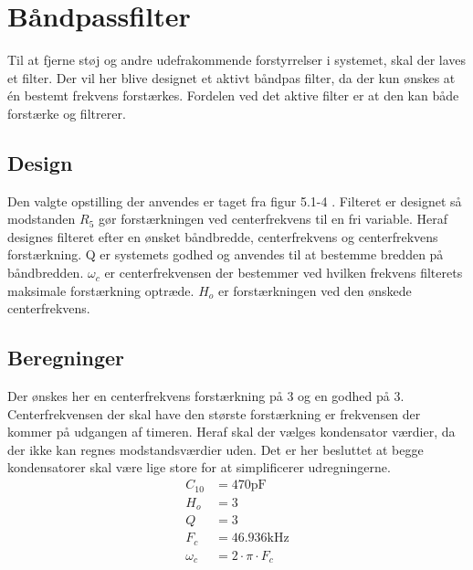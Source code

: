 \section{Båndpassfilter}\label{sec:filter}
Til at fjerne støj og andre udefrakommende forstyrrelser i systemet, skal der laves et filter.
Der vil her blive designet et aktivt båndpas filter, da der kun ønskes at én bestemt frekvens forstærkes.
Fordelen ved det aktive filter er at den kan både forstærke og filtrerer.

\subsection{Design}
Den valgte opstilling der anvendes er taget fra figur 5.1-4 \cite[side. 208]{Huelsman1993}.
Filteret er designet så modstanden $R_5$ gør forstærkningen ved centerfrekvens til en fri variable.
Heraf designes filteret efter en ønsket båndbredde, centerfrekvens og centerfrekvens forstærkning. Q er systemets godhed og anvendes til at bestemme bredden på båndbredden. 
$\omega_c$ er centerfrekvensen der bestemmer ved hvilken frekvens filterets maksimale forstærkning optræde.
$H_o$ er forstærkningen ved den ønskede centerfrekvens.

\subsection{Beregninger}
Der ønskes her en centerfrekvens forstærkning på 3 og en godhed på 3. 
Centerfrekvensen der skal have den største forstærkning er frekvensen der kommer på udgangen af timeren.
Heraf skal der vælges kondensator værdier, da der ikke kan regnes modstandsværdier uden. 
Det er her besluttet at begge kondensatorer skal være lige store for at simplificerer udregningerne.
\begin{align}
	C_{10} & = 470 \si{\pico\farad} \nonumber \\
	H_o & = 3 \nonumber \\
	Q & = 3 \nonumber \\
	F_c & = 46.936 \si{\kilo\hertz} \nonumber \\
	\omega_c & = 2 \cdot \pi \cdot F_c
\end{align}

